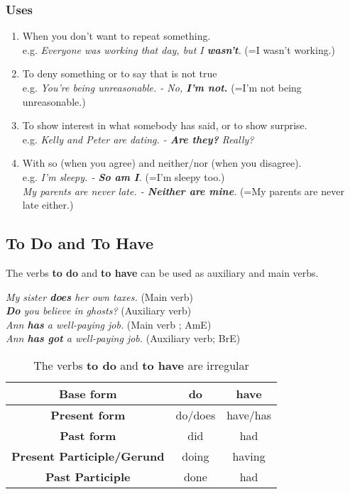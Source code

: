 \documentclass[hidelinks,10pt,a4paper]{article}
\begin{document}
\subsubsection{Uses}
\begin{enumerate}[label=(\alph*)]
	\item When you don't want to repeat something. \\
		e.g. \textit{Everyone was working that day, but I \textbf{wasn't}.} (=I wasn't working.)
	\item To deny something or to say that is not true \\
		e.g. \textit{You're being unreasonable. - No, \textbf{I'm not.}} (=I'm not being unreasonable.)
	\item To show interest in what somebody has said, or to show surprise. \\
		e.g. \textit{Kelly and Peter are dating. - \textbf{Are they?} Really?}
	\item With so (when you agree) and neither/nor (when you disagree). \\
		e.g. \textit{I'm sleepy. - \textbf{So am I}.} (=I'm sleepy too.) \\
    \textit{My parents are never late. - \textbf{Neither are mine}.} (=My parents are never late either.)
\end{enumerate}

\subsection{To Do and To Have}
The verbs \textbf{to do} and \textbf{to have} can be used as auxiliary and main verbs.

\begin{center}
	\textit{My sister \textbf{does} her own taxes.} (Main verb) \\
	\textit{\textbf{Do} you believe in ghosts?} (Auxiliary verb)  \\
	\textit{Ann \textbf{has} a well-paying job.} (Main verb ; AmE) \\
	\textit{Ann \textbf{has got} a well-paying job.} (Auxiliary verb; BrE)
\end{center}

\begin{table}[h]
\begin{center}
\begin{tabular}{|c|c|c|}
	\hline
	\textbf{Base form} & do & have \\ \hline
	\textbf{Present form}  & do/does & have/has \\ \hline
	\textbf{Past form} & did & had \\ \hline
	\textbf{Present Participle/Gerund} & doing & having \\ \hline
	\textbf{Past Participle} & done & had \\ \hline
\end{tabular}
\end{center}
\caption{The verbs \textbf{to do} and \textbf{to have} are irregular} \label{tab:tdth1}
\end{table}
\end{document}
